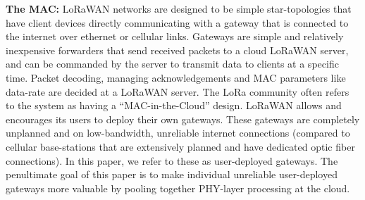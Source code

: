 
\noindent \textbf{The MAC: } LoRaWAN networks are designed to be simple
star-topologies that have client devices directly communicating with a gateway
that is connected to the internet over ethernet or cellular links. Gateways
are simple and relatively inexpensive forwarders that send received packets to
a cloud LoRaWAN server, and can be commanded by the server to transmit data to
clients at a specific time. Packet decoding, managing acknowledgements and MAC
parameters like data-rate are decided at a LoRaWAN server. The LoRa community
often refers to the system as having a ``MAC-in-the-Cloud'' design. LoRaWAN
allows and encourages its users to deploy their own gateways. These gateways
are completely unplanned and on low-bandwidth, unreliable internet connections
(compared to cellular base-stations that are extensively planned and have
dedicated optic fiber connections). In this paper, we refer to these as
user-deployed gateways. The penultimate goal of this paper is to make
individual unreliable user-deployed gateways more valuable by pooling together
PHY-layer processing at the cloud.
